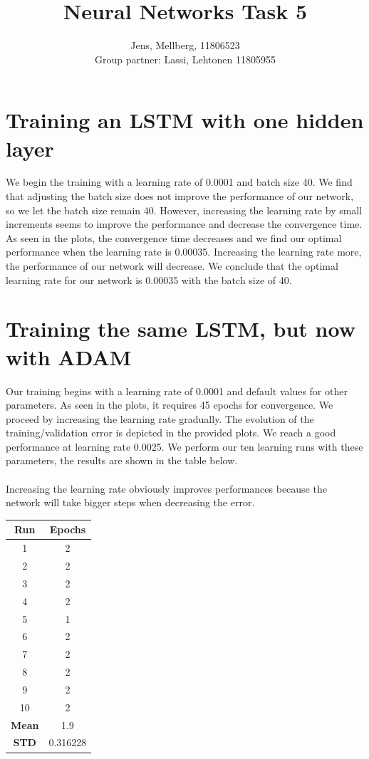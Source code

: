 \documentclass[a4paper]{article}
\title{Neural Networks Task 5}
\author{Jens, Mellberg, 11806523\\
		Group partner: Lassi, Lehtonen 11805955}
\begin{document}
\maketitle



\section{Training an LSTM with one hidden layer}

We begin the training with a learning rate of 0.0001 and batch size 40.
We find that adjusting the batch size does not improve the performance of our network, so we let the batch size remain 40.
However, increasing the learning rate by small increments seems to improve the performance and decrease the convergence time.
As seen in the plots, the convergence time decreases and we find our optimal performance when the learning rate is 0.00035.
Increasing the learning rate more, the performance of our network will decrease.
We conclude that the optimal learning rate for our network is 0.00035 with the batch size of 40.


\section{Training the same LSTM, but now with ADAM}

Our training begins with a learning rate of 0.0001 and default values for other parameters.
As seen in the plots, it requires 45 epochs for convergence. We proceed by increasing the learning rate gradually.
The evolution of the training/validation error is depicted in the provided plots. We reach a good performance at learning rate 0.0025.
We perform our ten learning runs with these parameters, the results are shown in the table below.\\\\
Increasing the learning rate obviously improves performances because the network will take bigger steps when decreasing the error. 

\begin{center}
	    \begin{tabular}{ |c|c|} 
 	        \hline
	        \textbf{Run } & \textbf{Epochs}  \\
	        \hline
	        1 & 2\\
 	        2 & 2\\
 	        3 & 2\\
 	        4 & 2\\
 	       5& 1\\
		6 & 2\\
		7 & 2\\
		8 & 2\\
		9 & 2\\
		10 & 2\\
		\hline
		\textbf{Mean} & 1.9\\
		\hline
		\textbf{STD} & 0.316228\\
 	        \hline
        \end{tabular}
    \end{center}
\end{document}
